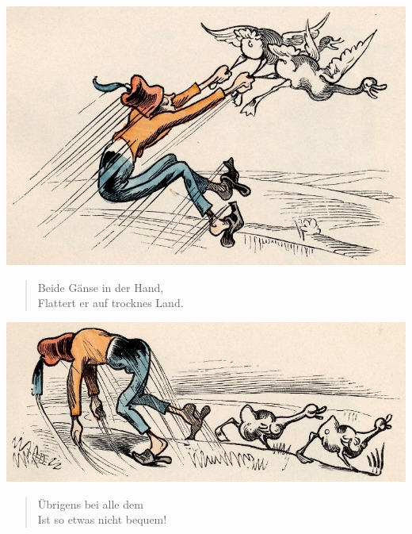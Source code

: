 \documentclass[a4paper,12pt]{article}
\begin{document}
\begin{center}\includegraphics[scale=.7, alt={... flattert er an Land}]{images/3-09.jpg}\end{center}



\begin{verse}
Beide Gänse in der Hand,\\{}
Flattert er auf trocknes Land.
\end{verse}



\begin{center}\includegraphics[scale=.7, alt={nass}]{images/3-10.jpg}\end{center}



\begin{verse}
Übrigens bei alle dem\\{}
Ist so etwas nicht bequem!
\end{verse}
\end{document}
